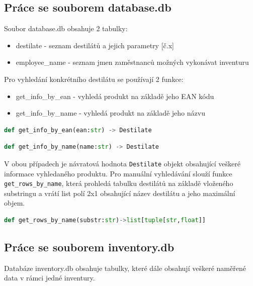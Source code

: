 \subsection{Práce se souborem database.db}
Soubor database.db obsahuje 2 tabulky:
\begin{itemize}
    \item destilate - seznam destilátů a jejich parametry [č.x]
    \item employee\_name - seznam jmen zaměstnanců možných vykonávat inventuru
\end{itemize}
Pro vyhledání konkrétního destilátu se používají 2 funkce:
\begin{itemize}
    \item get\_info\_by\_ean - vyhledá produkt na základě jeho EAN kódu
    \item get\_info\_by\_name - vyhledá produkt na základě jeho názvu
\end{itemize}
\begin{lstlisting}[language=Python,breaklines=false, frame=single]
def get_info_by_ean(ean:str) -> Destilate
\end{lstlisting}
\begin{lstlisting}[language=Python,breaklines=false, frame=single]
def get_info_by_name(name:str) -> Destilate
\end{lstlisting}
V obou případech je návratová hodnota \texttt{Destilate} objekt obsahující veškeré informace vyhledaného produktu.
Pro manuální vyhledávání slouží funkce \texttt{get\_rows\_by\_name}, která prohledá tabulku destilátů na základě vloženého substringu a vrátí list polí 2x1 obsahující název destilátu a jeho maximální objem.
\begin{lstlisting}[language=Python,breaklines=false, frame=single]
def get_rows_by_name(substr:str)->list[tuple[str,float]]
\end{lstlisting}

\subsection{Práce se souborem inventory.db}
Databáze inventory.db obsahuje tabulky, které dále obsahují veškeré naměřené data v rámci jedné inventury.

